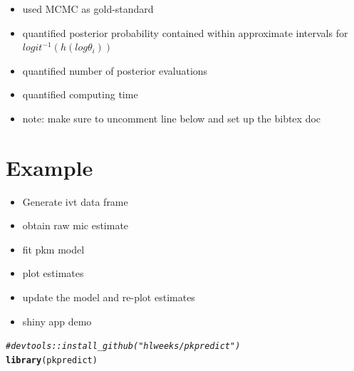 \documentclass{article}\usepackage[]{graphicx}\usepackage[]{color}
\makeatletter
\newcommand{\hlcom}[1]{\textcolor[rgb]{0.678,0.584,0.686}{\textit{#1}}}%
\newcommand{\hlstd}[1]{\textcolor[rgb]{0.345,0.345,0.345}{#1}}%
\newcommand{\hlkwd}[1]{\textcolor[rgb]{0.737,0.353,0.396}{\textbf{#1}}}%
\newenvironment{kframe}{%
 \def\at@end@of@kframe{}%
 \ifinner\ifhmode%
  \def\at@end@of@kframe{\end{minipage}}%
  \begin{minipage}{\columnwidth}%
 \fi\fi%
 \def\FrameCommand##1{\hskip\@totalleftmargin \hskip-\fboxsep
 \colorbox{shadecolor}{##1}\hskip-\fboxsep
     \hskip-\linewidth \hskip-\@totalleftmargin \hskip\columnwidth}%
 \MakeFramed {\advance\hsize-\width
   \@totalleftmargin\z@ \linewidth\hsize
   \@setminipage}}%
 {\par\unskip\endMakeFramed%
 \at@end@of@kframe}
\newenvironment{knitrout}{}{} %
\makeatother
\begin{document}
\begin{itemize}
\item used MCMC as gold-standard
\item quantified posterior probability contained within approximate intervals for $logit^{-1}(h(log \theta_i))$
\item quantified number of posterior evaluations %
\item quantified computing time %
\item note: make sure to uncomment line below and set up the bibtex doc
\end{itemize}





%



\section{Example}

\begin{itemize}
  \item Generate ivt data frame
  \item obtain raw mic estimate
  \item fit pkm model
  \item plot estimates
  \item update the model and re-plot estimates
  \item shiny app demo
\end{itemize}

\begin{knitrout}
\color{fgcolor}\begin{kframe}
\begin{alltt}
\hlcom{# devtools::install_github("hlweeks/pkpredict")}
\hlkwd{library}\hlstd{(pkpredict)}
\end{alltt}
\end{kframe}
\end{knitrout}
\end{document}
